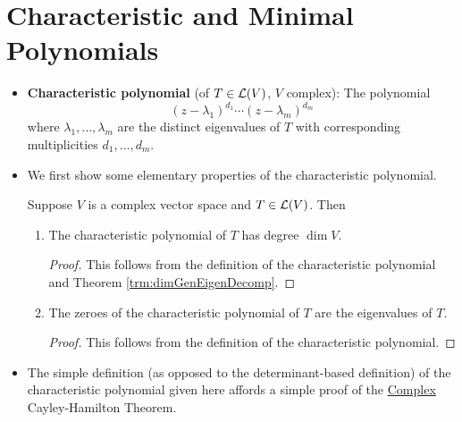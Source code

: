 \documentclass[../main.tex]{subfiles}
\begin{document}
\section{Characteristic and Minimal Polynomials}
\begin{itemize}
    \item {}\textbf{Characteristic polynomial} (of $T\in\mathcal{L}(V)$, $V$ complex): The polynomial
    \begin{equation*}
        (z-\lambda_1)^{d_1}\cdots(z-\lambda_m)^{d_m}
    \end{equation*}
    where $\lambda_1,\dots,\lambda_m$ are the distinct eigenvalues of $T$ with corresponding multiplicities $d_1,\dots,d_m$.
    \item We first show some elementary properties of the characteristic polynomial.
    \begin{theorem}\label{trm:charPolProperties}
        Suppose $V$ is a complex vector space and $T\in\mathcal{L}(V)$. Then
        \begin{enumerate}[label={\textup{(}\alph*\textup{)}},ref={\thetheorem\alph*}]
            \item \label{trm:charPolPropertiesa}The characteristic polynomial of $T$ has degree $\dim V$.
            \begin{proof}
                This follows from the definition of the characteristic polynomial and Theorem \ref{trm:dimGenEigenDecomp}.
            \end{proof}
            \item \label{trm:charPolPropertiesb}The zeroes of the characteristic polynomial of $T$ are the eigenvalues of $T$.
            \begin{proof}
                This follows from the definition of the characteristic polynomial.
            \end{proof}
        \end{enumerate}
    \end{theorem}
    \item The simple definition (as opposed to the determinant-based definition) of the characteristic polynomial given here affords a simple proof of the \hyperref[trm:ComplexCayleyHamilton]{Complex} Cayley-Hamilton Theorem.
    \begin{theorem}\label{trm:ComplexCayleyHamilton}

\end{theorem}
\end{itemize}
\end{document}
